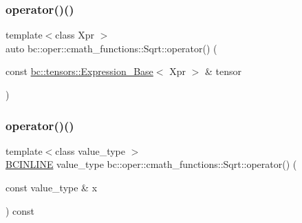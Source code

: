 \mbox{\label{structbc_1_1oper_1_1cmath__functions_1_1Sqrt_a6fd1a70d49b0085e9c557ef9957d206c}} 
\subsubsection{\texorpdfstring{operator()()}{operator()()}\hspace{0.1cm}{\footnotesize\ttfamily [2/3]}}
{\footnotesize\ttfamily template$<$class Xpr $>$ \\
auto bc\+::oper\+::cmath\+\_\+functions\+::\+Sqrt\+::operator() (\begin{DoxyParamCaption}\item[{const \hyperlink{classbc_1_1tensors_1_1Expression__Base}{bc\+::tensors\+::\+Expression\+\_\+\+Base}$<$ Xpr $>$ \&}]{tensor }\end{DoxyParamCaption})\hspace{0.3cm}{\ttfamily [inline]}}

\mbox{\label{structbc_1_1oper_1_1cmath__functions_1_1Sqrt_aef95681ef3d58402b24cf030ae32f69e}} 
\subsubsection{\texorpdfstring{operator()()}{operator()()}\hspace{0.1cm}{\footnotesize\ttfamily [3/3]}}
{\footnotesize\ttfamily template$<$class value\+\_\+type $>$ \\
\hyperlink{common_8h_a6699e8b0449da5c0fafb878e59c1d4b1}{B\+C\+I\+N\+L\+I\+NE} value\+\_\+type bc\+::oper\+::cmath\+\_\+functions\+::\+Sqrt\+::operator() (\begin{DoxyParamCaption}\item[{const value\+\_\+type \&}]{x }\end{DoxyParamCaption}) const\hspace{0.3cm}{\ttfamily [inline]}}



